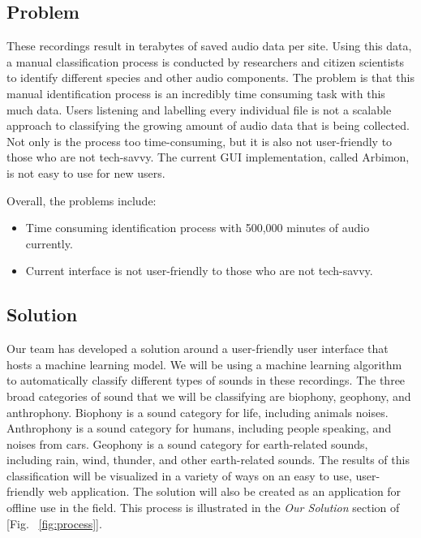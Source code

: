 \documentclass[12pt,journal,compsoc]{IEEEtran}
\newenvironment{subs}
  {\adjustwidth{1em}{0pt}}
  {\endadjustwidth}
\begin{document}
\begin{subs}
\subsection{Problem}
These recordings result in terabytes of saved audio data per site. Using this data, a manual classification process is conducted by researchers and citizen scientists to identify different species and other audio components. The problem is that this manual identification process is an incredibly time consuming task with this much data. Users listening and labelling every individual file is not a scalable approach to classifying the growing amount of audio data that is being collected. Not only is the process too time-consuming, but it is also not user-friendly to those who are not tech-savvy. The current GUI implementation, called Arbimon, is not easy to use for new users. 

\skippingparagraph Overall, the problems include:
\begin{subs}
\begin{itemize}
    \item Time consuming identification process with 500,000 minutes of audio currently.
    \item Current interface is not user-friendly to those who are not tech-savvy.
\end{itemize}
\end{subs}

\subsection{Solution}
Our team has developed a solution around a user-friendly user interface that hosts a machine learning model. We will be using a machine learning algorithm to automatically classify different types of sounds in these recordings. The three broad categories of sound that we will be classifying are biophony, geophony, and anthrophony. Biophony is a sound category for life, including animals noises. Anthrophony is a sound category for humans, including people speaking, and noises from cars. Geophony is a sound category for earth-related sounds, including rain, wind, thunder, and other earth-related sounds. The results of this classification will be visualized in a variety of ways on an easy to use, user-friendly web application. The solution will also be created as an application for offline use in the field. This process is illustrated in the \emph{Our Solution} section of [Fig. ~\ref{fig:process}].


\end{subs}
\end{document}
